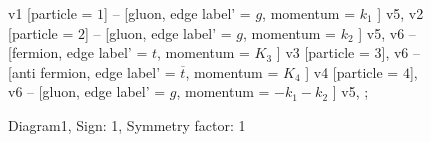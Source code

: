 \documentclass{revtex4}
\begin{document}
\begin{figure}[!htb]
\begin{center}
{    %
v1 [particle = \(1\)] -- [gluon, edge label' = \(g\), momentum = \(k_{1}\) ] v5, 
v2 [particle = \(2\)] -- [gluon, edge label' = \(g\), momentum = \(k_{2}\) ] v5, 
v6 -- [fermion, edge label' = \(t\), momentum = \(K_{3}\) ] v3 [particle = \(3\)], 
v6 -- [anti fermion, edge label' = \(\overline{t}\), momentum = \(K_{4}\) ] v4 [particle = \(4\)], 
v6 -- [gluon, edge label' = \(g\), momentum = \(-k_{1} - k_{2}\) ] v5, 
};
\end{center}
\caption{Diagram1, Sign: 1, Symmetry factor: 1}
\end{figure}
\newpage
\end{document}
